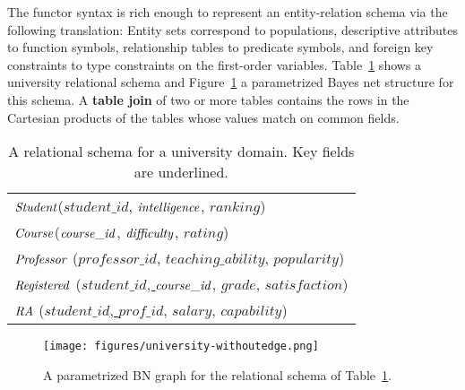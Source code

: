 \documentclass[letterpaper]{article}
\begin{document}
The functor syntax is rich enough to represent an entity-relation schema \cite{Ullman1982} via the following translation: Entity sets correspond to populations, descriptive attributes to function symbols, relationship tables to predicate symbols, and foreign key constraints to type constraints on the first-order variables.
Table~\ref{fig:university-tables} shows a university relational schema and Figure~\ref{fig:university-tables} a parametrized Bayes net structure for this schema. A \textbf{table join} of two or more tables contains the rows in the Cartesian products of the tables whose values match on common fields.


 \begin{table}[tbp] \centering
{\small
\begin{tabular}
[c]{|l|}\hline
$\mathit{Student}$(\underline{$student\_id$}, $\mathit{intelligence}$, $ranking$)\\
$\it{Course}$(\underline{$\it{course}\_id$}, $\mathit{difficulty}$, $rating$)\\ 
$\mathit{Professor}$ (\underline{$professor\_id$}, $teaching\_ability$, $popularity$)\\
$\mathit{Registered}$ (\underline{$student\_id$, $\it{course}\_id$}, $grade$, $satisfaction$)\\
$\mathit{RA}$ (\underline{$student\_id$, $prof\_id$}, $salary$, $capability$)\\
\hline
\end{tabular}
}
\caption{A relational schema for a university domain. Key fields are underlined. 
\label{table:university-schema}} 
\end{table}


%
\begin{figure}[htbp] %
   \centering
   \texttt{[image: figures/university-withoutedge.png]} 
   \caption{A parametrized BN graph for the relational schema of Table~\ref{table:university-schema}. \label{fig:university-tables}}
\end{figure}
\end{document}
